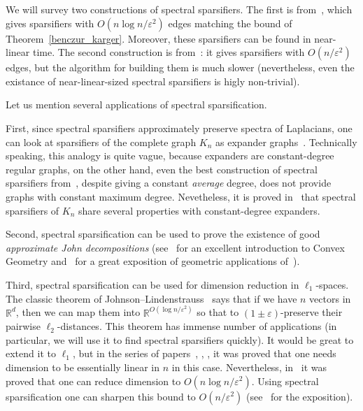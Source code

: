 \documentclass[12pt]{article}
\newcommand{\eps}{\varepsilon}
\begin{document}
    We will survey two constructions of spectral sparsifiers. The first is from~\cite{SS11}, which gives sparsifiers
    with $O(n \log n / \eps^2)$ edges
    matching the bound of Theorem~\ref{benczur_karger}. Moreover, these sparsifiers can be found
    in near-linear time. The second construction is from~\cite{BSS09}: it gives sparsifiers with $O(n / \eps^2)$ edges,
    but the algorithm for building them is much slower (nevertheless, even the existance of near-linear-sized spectral
    sparsifiers is higly non-trivial).

    Let us mention several applications of spectral sparsification.

    First, since spectral sparsifiers approximately preserve spectra of Laplacians, one can look at sparsifiers of the
    complete graph $K_n$ as expander graphs~\cite{HLW06}. Technically speaking, this analogy is quite vague, because
    expanders are constant-degree regular graphs, on the other hand, even the best construction of spectral sparsifiers
    from~\cite{BSS09}, despite giving a constant \emph{average} degree, does not provide graphs with constant maximum
    degree. Nevetheless, it is proved in~\cite{BSS09} that spectral sparsifiers of $K_n$ share several properties with
    constant-degree expanders.

    Second, spectral sparsification can be used to prove the existence of good \emph{approximate John decompositions}
    (see~\cite{B97} for an excellent introduction to Convex Geometry and~\cite{N11} for a great exposition of geometric
    applications of~\cite{BSS09}).

    Third, spectral sparsification can be used for dimension reduction in $\ell_1$-spaces.
    The classic theorem of Johnson--Lindenstrauss~\cite{DG03}
    says that if we have $n$ vectors in $\mathbb{R}^d$, then we can map them into $\mathbb{R}^{O(\log n / \eps^2)}$
    so that to $(1\pm\eps)$-preserve their pairwise $\ell_2$-distances.
    This theorem has immense number of applications (in particular, we will use it to find spectral sparsifiers quickly).
    It would be great to extend it to $\ell_1$, but in the series of papers~\cite{BC05}, \cite{LN04}, \cite{ACNN11},
    \cite{R11a} it was proved that one needs dimension to be essentially linear in $n$ in this case.
    Nevertheless, in~\cite{T90}
    it was proved that one can reduce dimension to $O(n \log n / \eps^2)$. Using spectral sparsification one can sharpen
    this bound to $O(n / \eps^2)$ (see~\cite{N11} for the exposition).
\end{document}

